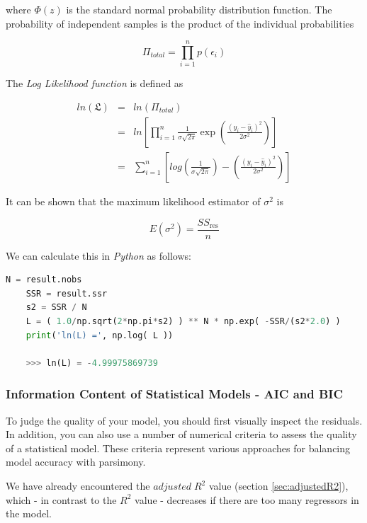 where $\Phi(z)$ is the standard normal probability distribution function. The probability of independent samples is the product of the individual probabilities

\begin{equation}
  \Pi_{total} = \prod_{i=1}^n p(\epsilon_i)
\end{equation}

The \emph{Log Likelihood function}  is defined as

\begin{eqnarray*}
  ln(\mathfrak{L}) &=& ln(\Pi_{total}) \\
  &=& ln\left[\prod_{i=1}^n \frac{1}{\sigma\sqrt{2 \pi}} \exp \left(\frac{(y_i - \hat{y}_i)^2}{2 \sigma^2}\right)\right] \\
  &=& \sum_{i=1}^n\left[log\left(\frac{1}{\sigma \sqrt{2 \pi}}\right)- \left(\frac{(y_i - \hat{y}_i)^2}{2 \sigma^2}\right)\right]
\end{eqnarray*}

It can be shown that the maximum likelihood estimator of $\sigma^2$ is

\begin{equation}
  E(\sigma^2) = \frac{SS_\text{res}}{n}
\end{equation}

We can calculate this in \emph{Python} as follows:

\begin{lstlisting}[language=Python]
    N = result.nobs
    SSR = result.ssr
    s2 = SSR / N
    L = ( 1.0/np.sqrt(2*np.pi*s2) ) ** N * np.exp( -SSR/(s2*2.0) )
    print('ln(L) =', np.log( L ))

    >>> ln(L) = -4.99975869739

\end{lstlisting}


\subsubsection{Information Content of Statistical Models - AIC and BIC}

To judge the quality of your model, you should first visually inspect the residuals. In addition, you can also use a number of numerical criteria to assess the quality of a statistical model. These criteria represent various approaches for balancing model accuracy with parsimony.

We have already encountered the $adjusted\; R^2$ value (section \ref{sec:adjustedR2}), which - in contrast to the $R^2$ value - decreases if there are too many regressors in the model.

